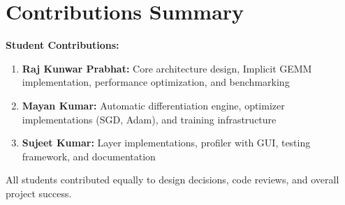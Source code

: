\documentclass[12pt,oneside,a4paper]{report}
\begin{document}
\section{Contributions Summary}

\textbf{Student Contributions:}

\begin{enumerate}
    \item \textbf{Raj Kunwar Prabhat:} Core architecture design, Implicit GEMM implementation, performance optimization, and benchmarking
    \item \textbf{Mayan Kumar:} Automatic differentiation engine, optimizer implementations (SGD, Adam), and training infrastructure
    \item \textbf{Sujeet Kumar:} Layer implementations, profiler with GUI, testing framework, and documentation
\end{enumerate}

All students contributed equally to design decisions, code reviews, and overall project success.

\newpage
\end{document}
